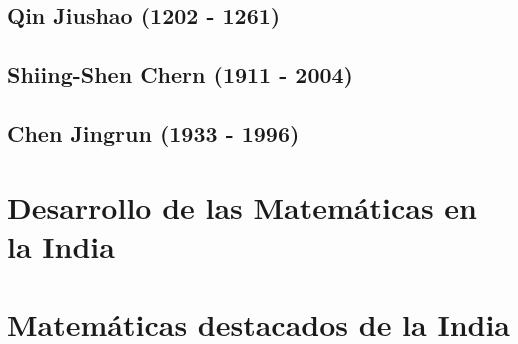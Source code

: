 \documentclass[a4paper, 11pt]{article}
\begin{document}
	\subsection{Qin Jiushao (1202 - 1261)}
	\subsection{Shiing-Shen Chern (1911 - 2004)}
	\subsection{Chen Jingrun (1933 - 1996)}
				
\section{Desarrollo de las Matemáticas en la India}
\section{Matemáticas destacados de la India}

\newpage
{}

\end{document}
